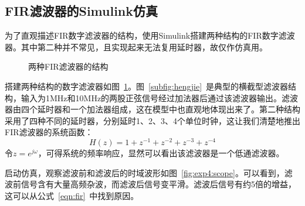 \subsection{FIR滤波器的Simulink仿真}
为了直观描述FIR数字滤波器的结构，使用Simulink搭建两种结构的FIR数字滤波器。其中第二种并不常见，且实现起来无法复用延时器，故仅作仿真用。

\begin{figure}[htbp]
  \hfill
  \caption{两种FIR滤波器的结构}
  \label{fig:exp4:simulink}
\end{figure}
搭建两种结构的数字滤波器如图~\ref{fig:exp4:simulink}。图~\ref{subfig:hengjie}~是典型的横截型滤波器结构，输入为1MHz和10MHz的两股正弦信号经过加法器后通过该滤波器输出。滤波器由四个延时器和一个加法器组成，这在模型中也直观地体现出来了。第二种结构采用了四种不同的延时器，分别延时1、2、3、4个单位时钟，这让我们清楚地推出FIR滤波器的系统函数：
\begin{equation}\label{eqn:fir}
  H(z) = 1 + z^{-1} + z^{-2} +z^{-3} +z^{-4}
\end{equation}
令$z = e^{j\omega}$，可得系统的频率响应，显然可以看出该滤波器是一个低通滤波器。

启动仿真，观察滤波前和滤波后的时域波形如图~\ref{fig:exp4:scope}。可以看到，滤波前信号含有大量高频杂波，而滤波后信号变平滑。滤波后信号有约5倍的增益，这可以从公式~\ref{eqn:fir}~中找到原因。

